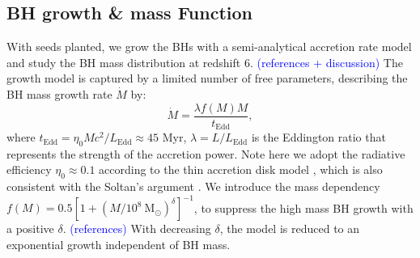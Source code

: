 \documentclass[nolinenumbers,preprint2,tighten]{aastex631}
\newcommand{\Msun}{\mathrm{M_\odot}}
\newcommand{\Mdot}{\dot{M}}
\newcommand{\tEdd}{t_\mathrm{Edd}}
\newcommand{\blue}[1]{\textcolor{blue}{ #1}}
\begin{document}
\begin{CJK*}{UTF8}{gbsn}
\subsection{BH growth \& mass Function}\label{sec:MF}
With seeds planted, we grow the BHs with a semi-analytical accretion rate model 
and study the BH mass distribution at redshift 6. 
\blue{(references + discussion)}
The growth model is captured by a limited number of free parameters, 
describing the BH mass growth rate $\Mdot$ by: 
\begin{equation}
  \label{eq:mdot}
  \Mdot = \frac{\lambda f\left(M\right) M}{\tEdd},
\end{equation}
where $\tEdd = \eta_0  M c^2/L_{\mathrm{Edd}} \approx 45$ Myr,
$\lambda = L/L_\mathrm{Edd}$ is the Eddington ratio that represents the strength of the accretion power.
Note here we adopt the radiative efficiency $\eta_0 \approx 0.1 $ according to the thin accretion disk model 
\citep{1973A&A....24..337S}, which is also consistent with 
the Soltan's argument  \citep{1982MNRAS.200..115S,2002MNRAS.335..965Y}.
We introduce the mass dependency 
$f(M) = 0.5 \left[1+\left(M/10^8~\Msun\right)^\delta\right] ^ {-1}$, 
to suppress the high mass BH growth with a positive $\delta$. 
\blue{(references)}
With decreasing $\delta$, 
the model is reduced to an exponential growth independent of BH mass.


\end{CJK*}
\end{document}
